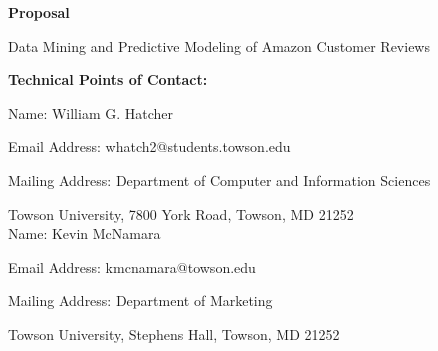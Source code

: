\documentclass[12pt]{article}
\begin{document}

\begin{center}
	\Large{\bfseries Proposal }\\[18pt]
\end{center}

\begin{flushleft}

	\begin{center}
		\Large Data Mining and Predictive Modeling of Amazon Customer Reviews\\[30pt]
	\end{center}


	\item{\bfseries Technical Points of Contact:}

		\hspace{4ex} Name: William G. Hatcher
		
		\hspace{4ex} Email Address: whatch2@students.towson.edu
		
		\hspace{4ex} Mailing Address: Department of Computer and Information Sciences
		
		\hspace{22ex} Towson University, 7800 York Road, Towson, MD 21252
		\\[11pt]
 
 
		 \hspace{4ex} Name: Kevin McNamara
		 
		 \hspace{4ex} Email Address: kmcnamara@towson.edu
		 
		 \hspace{4ex} Mailing Address: Department of Marketing
		 
		 \hspace{22ex} Towson University, Stephens Hall, Towson, MD 21252
		 \\[11pt]
 

\end{flushleft}
\end{document}
